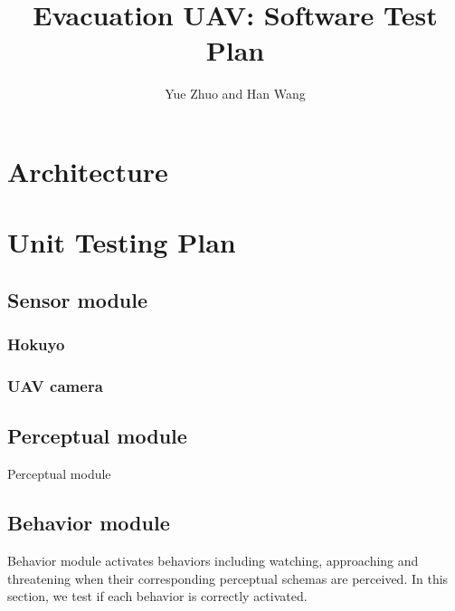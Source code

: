 
\usepackage{graphicx}
\usepackage{subfigure}
\usepackage{enumerate}
\usepackage{threeparttable}
\usepackage[colorlinks,linkcolor=red,anchorcolor=blue,citecolor=green]{hyperref}

\title{Evacuation UAV: Software Test Plan}

\author{Yue Zhuo and Han Wang}

\large

\maketitle


 

\section{Architecture}


\section{Unit Testing Plan}

\subsection{Sensor module}
\subsubsection{Hokuyo}

\subsubsection{UAV camera}


\subsection{Perceptual module}
Perceptual module 

\subsection{Behavior module}
Behavior module activates behaviors including watching, approaching and threatening when their corresponding perceptual schemas are perceived. In this section, we test if each behavior is correctly activated.

